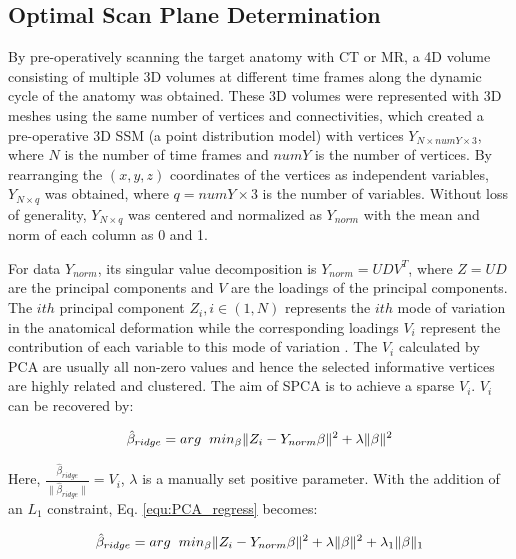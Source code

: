 \documentclass[review]{elsarticle}
\begin{document}
\subsection{Optimal Scan Plane Determination}
\label{Sec: Optimal Scan Plane}
By pre-operatively scanning the target anatomy with CT or MR, a 4D volume consisting of multiple 3D volumes at different time frames along the dynamic cycle of the anatomy was obtained. These 3D volumes were represented with 3D meshes using the same number of vertices and connectivities, which created a pre-operative 3D SSM (a point distribution model) with vertices $Y_{N\times numY\times 3}$, where $N$ is the number of time frames and $numY$ is the number of vertices. By rearranging the $(x, y, z)$ coordinates of the vertices as independent variables, $Y_{N\times q}$ was obtained, where $q=numY\times 3$ is the number of variables. Without loss of generality, $Y_{N\times q}$ was centered and normalized as $Y_{norm}$ with the mean and norm of each column as 0 and 1.

For data $Y_{norm}$, its singular value decomposition is $Y_{norm}=UDV^T$, where $Z=UD$ are the principal components and $V$ are the loadings of the principal components. The $ith$ principal component $Z_i, i\in (1, N)$ represents the $ith$ mode of variation in the anatomical deformation while the corresponding loadings $V_i$ represent the contribution of each variable to this mode of variation \citep{lee2005assessment}. The $V_i$ calculated by PCA are usually all non-zero values and hence the selected informative vertices are highly related and clustered. The aim of SPCA is to achieve a sparse $V_i$. $V_i$ can be recovered by:

\begin{equation}
\hat{\beta}_{ridge}=arg\hspace{0.2cm} min_{\beta}\|Z_i-Y_{norm}\beta\|^2+\lambda\|\beta\|^2
\label{equ:PCA_regress}
\end{equation}

Here, $\frac{\hat{\beta}_{ridge}}{\|\hat{\beta}_{ridge}\|}=V_i$, $\lambda$ is a manually set positive parameter. With the addition of an $L_1$ constraint, Eq. \ref{equ:PCA_regress} becomes:

\begin{equation}
\hat{\beta}_{ridge}=arg\hspace{0.2cm} min_{\beta}\|Z_i-Y_{norm}\beta\|^2+\lambda\|\beta\|^2+\lambda_1\|\beta\|_1
\label{equ:PCA_constraint}
\end{equation}
\end{document}
